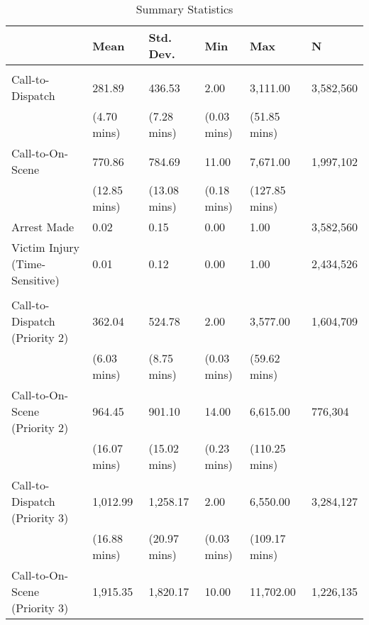 \begin{table}[H]

\caption{\label{summary_stats}Summary Statistics}
\centering
\fontsize{10}{12}\selectfont
\begin{threeparttable}
\begin{tabular}[t]{llllll}
\toprule
  & Mean & Std. Dev. & Min & Max & N\\
\midrule
\addlinespace[0.3em]
\multicolumn{6}{l}{\textbf{Panel A: Priority 1 Outcomes:}}\\
\hspace{1em}Call-to-Dispatch & 281.89 & 436.53 & 2.00 & 3,111.00 & 3,582,560\\
\hspace{1em} & (4.70 mins) & (7.28 mins) & (0.03 mins) & (51.85 mins) & \\
\hspace{1em}Call-to-On-Scene & 770.86 & 784.69 & 11.00 & 7,671.00 & 1,997,102\\
\hspace{1em} & (12.85 mins) & (13.08 mins) & (0.18 mins) & (127.85 mins) & \\
\hspace{1em}Arrest Made & 0.02 & 0.15 & 0.00 & 1.00 & 3,582,560\\
\hspace{1em}Victim Injury (Time-Sensitive) & 0.01 & 0.12 & 0.00 & 1.00 & 2,434,526\\
\addlinespace[0.5cm]
\multicolumn{6}{l}{\textbf{Panel B: Secondary Outcomes:}}\\
\hspace{1em}Call-to-Dispatch (Priority 2) & 362.04 & 524.78 & 2.00 & 3,577.00 & 1,604,709\\
\hspace{1em} & (6.03 mins) & (8.75 mins) & (0.03 mins) & (59.62 mins) & \\
\hspace{1em}Call-to-On-Scene (Priority 2) & 964.45 & 901.10 & 14.00 & 6,615.00 & 776,304\\
\hspace{1em} & (16.07 mins) & (15.02 mins) & (0.23 mins) & (110.25 mins) & \\
\hspace{1em}Call-to-Dispatch (Priority 3) & 1,012.99 & 1,258.17 & 2.00 & 6,550.00 & 3,284,127\\
\hspace{1em} & (16.88 mins) & (20.97 mins) & (0.03 mins) & (109.17 mins) & \\
\hspace{1em}Call-to-On-Scene (Priority 3) & 1,915.35 & 1,820.17 & 10.00 & 11,702.00 & 1,226,135\\

\end{tabular}
\end{threeparttable}
\end{table}
